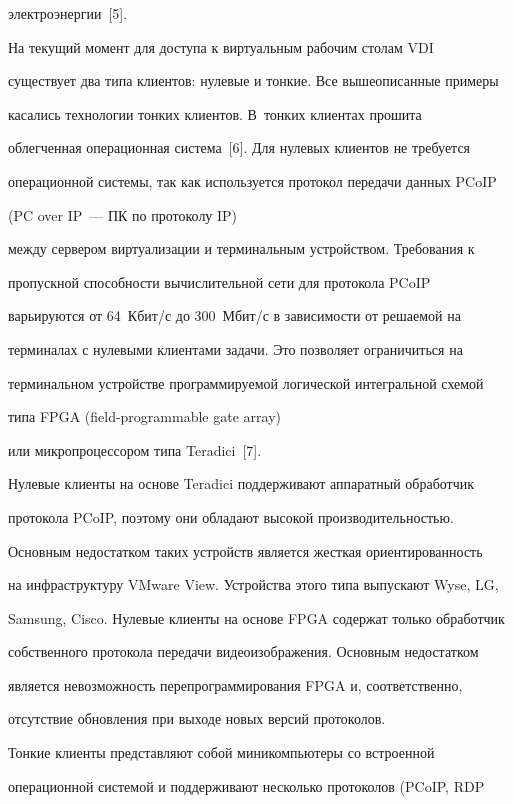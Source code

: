 электроэнергии~[5]. 

  

  На текущий момент для доступа к виртуальным рабочим столам VDI 

существует два типа клиентов: нулевые и тонкие. Все вышеописанные примеры 

касались технологии тонких клиентов. В~тонких клиентах прошита 

облегченная операционная система~[6]. Для нулевых клиентов не требуется 

операционной системы, так как используется протокол передачи данных PCoIP 

(PC over IP~--- ПК по протоколу IP)

между сервером виртуализации и терминальным устройством. Требования к 

пропускной способности вычислительной сети для протокола PCoIP 

варьируются от 64~Кбит/с до 300~Мбит/с в зависимости от решаемой на 

терминалах с нулевыми клиентами задачи. Это позволяет ограничиться на 

терминальном устройстве программируемой логической интегральной схемой 

типа FPGA (field-programmable gate array)

или микропроцессором типа Teradici~[7]. 

  

  Нулевые клиенты на основе Teradici поддерживают аппаратный обработчик 

протокола PCoIP, поэтому они обладают высокой производительностью. 

Основным недостатком таких устройств является жесткая ориентированность 

на инфраструктуру VMware View. Устройства этого типа выпускают Wyse, LG, 

Samsung, Cisco. Нулевые клиенты на основе FPGA содержат только обработчик 

собственного протокола передачи видеоизображения. Основным недостатком 

является невозможность перепрограммирования FPGA и, соответственно, 

отсутствие обновления при выходе новых версий протоколов. 

  

  Тонкие клиенты представляют собой миникомпьютеры со встроенной 

операционной системой и поддерживают несколько протоколов (PCoIP, RDP 

